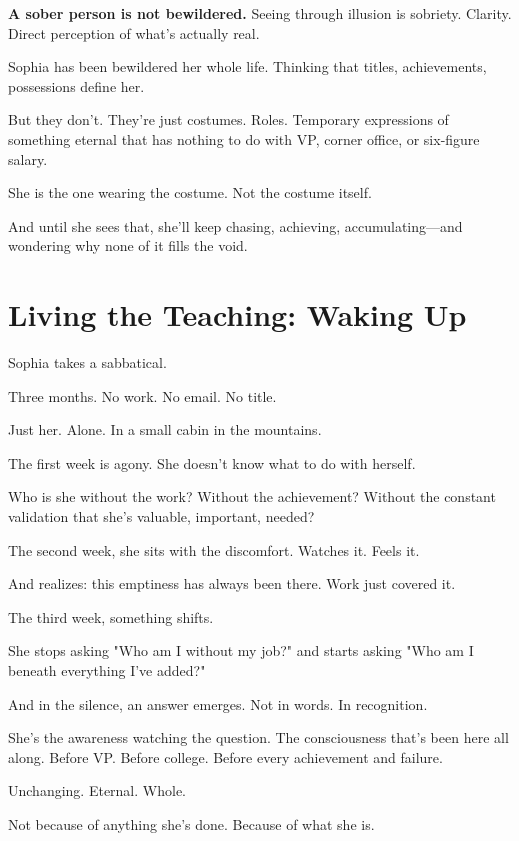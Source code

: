 \documentclass[11pt,twoside]{book}
\begin{document}
\textbf{\textbf{A sober person is not bewildered.}} Seeing through illusion is sobriety. Clarity. Direct perception of what's actually real.

Sophia has been bewildered her whole life. Thinking that titles, achievements, possessions define her.

But they don't. They're just costumes. Roles. Temporary expressions of something eternal that has nothing to do with VP, corner office, or six-figure salary.

She is the one wearing the costume. Not the costume itself.

And until she sees that, she'll keep chasing, achieving, accumulating—and wondering why none of it fills the void.

\section*{Living the Teaching: Waking Up}

Sophia takes a sabbatical.

Three months. No work. No email. No title.

Just her. Alone. In a small cabin in the mountains.

The first week is agony. She doesn't know what to do with herself.

Who is she without the work? Without the achievement? Without the constant validation that she's valuable, important, needed?

The second week, she sits with the discomfort. Watches it. Feels it.

And realizes: this emptiness has always been there. Work just covered it.

The third week, something shifts.

She stops asking "Who am I without my job?" and starts asking "Who am I beneath everything I've added?"

And in the silence, an answer emerges. Not in words. In recognition.

She's the awareness watching the question. The consciousness that's been here all along. Before VP. Before college. Before every achievement and failure.

Unchanging. Eternal. Whole.

Not because of anything she's done. Because of what she is.
\end{document}
